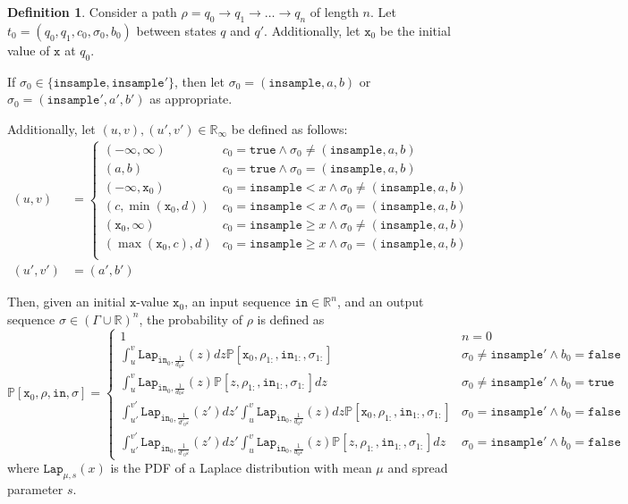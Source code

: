 \documentclass[12pt]{article}
\newcommand{\RR}{\mathbb{R}}
\newcommand{\PP}{\mathbb{P}}
\newcommand{\gguard}[1][x]{\texttt{insample}\geq #1}
\newcommand{\lguard}[1][x]{\texttt{insample} < #1}
\newcommand{\Lap}{\texttt{Lap}}
\theoremstyle{definition}
\newtheorem{defn}[thm]{Definition}
\begin{document}
\begin{defn}
    Consider a path $\rho = q_0\to q_1\to \ldots \to q_n$ of length $n$. Let $t_0=(q_0, q_1, c_0, \sigma_0, b_0)$ between states $q$ and $q'$. Additionally, let $\texttt{x}_0$ be the initial value of $\texttt{x}$ at $q_0$. 
    
    If $\sigma_0 \in \{\texttt{insample}, \texttt{insample}'\}$, then let $\sigma_0 = (\texttt{insample}, a, b)$ or $\sigma_0 = (\texttt{insample}', a', b')$ as appropriate. 

    Additionally, let $(u, v), (u', v')\in \RR_{\infty}$ be defined as follows:
    \begin{align*}
        (u, v) &= \begin{cases}
        (-\infty, \infty) & c_0=\texttt{true}\land \sigma_0 \neq (\texttt{insample}, a, b)\\
        (a, b) &c_0=\texttt{true}\land \sigma_0 = (\texttt{insample}, a, b)\\
        (-\infty, \texttt{x}_0) & c_0=\lguard\land \sigma_0 \neq (\texttt{insample}, a, b)\\
        (c, \min(\texttt{x}_0, d)) &c_0=\lguard\land \sigma_0 = (\texttt{insample}, a, b)\\
        (\texttt{x}_0, \infty) & c_0=\gguard\land \sigma_0 \neq (\texttt{insample}, a, b)\\
        (\max(\texttt{x}_0, c), d) &c_0=\gguard\land \sigma_0 = (\texttt{insample}, a, b)\\
    \end{cases}\\
    (u', v')& = (a', b')\end{align*}

    Then, given an initial $\texttt{x}$-value $\texttt{x}_0$, an input sequence $\texttt{in}\in \RR^n$, and an output sequence $\sigma\in (\Gamma\cup\RR)^n$, the probability of $\rho$ is defined as \[
        \PP[\texttt{x}_0, \rho, \texttt{in}, \sigma] = \begin{cases}
            1 & n = 0\\
            \int_u^v \Lap_{\texttt{in}_0, \frac{1}{d_0\varepsilon}}(z)dz\PP[\texttt{x}_0, \rho_{1:}, \texttt{in}_{1:}, \sigma_{1:}] & \sigma_0 \neq \texttt{insample}' \land b_0 = \texttt{false}\\
            \int_u^v \Lap_{\texttt{in}_0, \frac{1}{d_0\varepsilon}}(z)\PP[z, \rho_{1:}, \texttt{in}_{1:}, \sigma_{1:}]dz  & \sigma_0 \neq \texttt{insample}'\land b_0=\texttt{true} \\
            \int_{u'}^{v'}\Lap_{\texttt{in}_0, \frac{1}{d'_0\varepsilon}}(z')dz'\int_u^v \Lap_{\texttt{in}_0, \frac{1}{d_0\varepsilon}}(z)dz\PP[\texttt{x}_0, \rho_{1:}, \texttt{in}_{1:}, \sigma_{1:}]& \sigma_0 = \texttt{insample}'\land b_0 = \texttt{false}\\
            \int_{u'}^{v'}\Lap_{\texttt{in}_0, \frac{1}{d'_0\varepsilon}}(z')dz'\int_u^v \Lap_{\texttt{in}_0, \frac{1}{d_0\varepsilon}}(z)\PP[z, \rho_{1:}, \texttt{in}_{1:}, \sigma_{1:}]dz& \sigma_0 = \texttt{insample}'\land b_0 = \texttt{false}
        \end{cases}
    \]
    where $\Lap_{\mu, s}(x)$ is the PDF of a Laplace distribution with mean $\mu$ and spread parameter $s$.
\end{defn}
\end{document}
